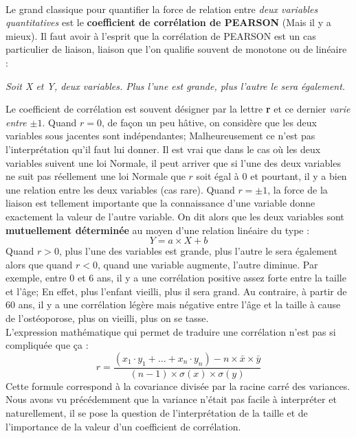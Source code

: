 \\
Le grand classique pour quantifier la force de relation entre \textit{deux variables quantitatives} est le \textbf{coefficient de corrélation de PEARSON} (Mais il y a mieux). Il faut avoir à l'esprit que la corrélation de PEARSON est un cas particulier de liaison, liaison que l'on qualifie souvent de monotone ou de linéaire :
\begin{center}
\textit{Soit X et Y, deux variables. Plus l'une est grande, plus l'autre le sera également.}
\end{center}  
Le coefficient de corrélation est souvent désigner par la lettre \textbf{r} et ce dernier \textit{varie entre $\pm 1$}. Quand $r=0$, de façon un peu hâtive, on considère que les deux variables sous jacentes sont indépendantes; Malheureusement ce n'est pas l'interprétation qu'il faut lui donner. \newline 
Il est vrai que dans le cas où les deux variables suivent une loi Normale, il peut arriver que si l'une des deux variables ne suit pas réellement une loi Normale que $r$ soit égal à 0 et pourtant, il y a bien une relation entre les deux variables (cas rare). \newline
Quand $r=\pm 1$, la force de la liaison est tellement importante que la connaissance d'une variable donne exactement la valeur de l'autre variable. On dit alors que les deux variables sont \textbf{mutuellement déterminée} au moyen d'une relation linéaire du type :
$$Y=a\times X + b$$
Quand $r>0$, plus l'une des variables est grande, plus l'autre le sera également alors que quand $r<0$, quand une variable augmente, l'autre diminue. Par exemple, entre 0 et 6 ans, il y a une corrélation positive assez forte entre la taille et l'âge; En effet, plus l'enfant vieilli, plus il sera grand. Au contraire, à partir de 60 ans, il y a une corrélation légère mais négative entre l'âge et la taille à cause de l'ostéoporose, plus on vieilli, plus on se tasse.\newline
\\
L'expression mathématique qui permet de traduire une corrélation n'est pas si compliquée que ça : 
$$r=\frac{(x_{1}\cdot y_{1} + \dots + x_{n}\cdot y_{n})-n\times\bar{x}\times\bar{y}}{(n-1)\times \sigma(x)\times \sigma(y)}$$
Cette formule correspond à la covariance divisée par la racine carré des variances.\newline 
Nous avons vu précédemment que la variance n'était pas facile à interpréter et naturellement, il se pose la question de l'interprétation de la taille et de l'importance de la valeur d'un coefficient de corrélation.
